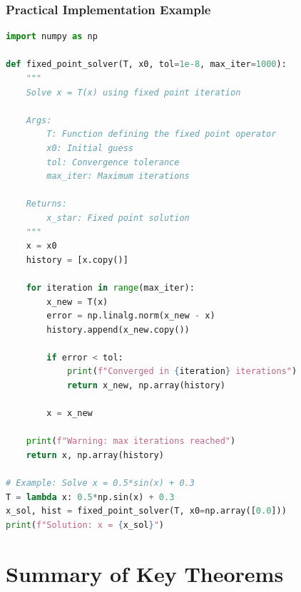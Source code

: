 \documentclass[aspectratio=169,10pt]{beamer}
\begin{document}
\begin{frame}[fragile]
    \frametitle{Practical Implementation Example}

    \begin{lstlisting}[language=Python, caption=Fixed Point Iteration Solver]
import numpy as np

def fixed_point_solver(T, x0, tol=1e-8, max_iter=1000):
    """
    Solve x = T(x) using fixed point iteration

    Args:
        T: Function defining the fixed point operator
        x0: Initial guess
        tol: Convergence tolerance
        max_iter: Maximum iterations

    Returns:
        x_star: Fixed point solution
    """
    x = x0
    history = [x.copy()]

    for iteration in range(max_iter):
        x_new = T(x)
        error = np.linalg.norm(x_new - x)
        history.append(x_new.copy())

        if error < tol:
            print(f"Converged in {iteration} iterations")
            return x_new, np.array(history)

        x = x_new

    print(f"Warning: max iterations reached")
    return x, np.array(history)

# Example: Solve x = 0.5*sin(x) + 0.3
T = lambda x: 0.5*np.sin(x) + 0.3
x_sol, hist = fixed_point_solver(T, x0=np.array([0.0]))
print(f"Solution: x = {x_sol}")
    \end{lstlisting}
\end{frame}

\section{Summary of Key Theorems}
\end{document}
